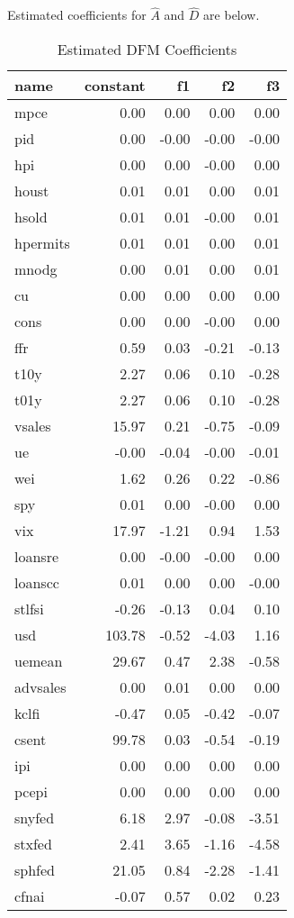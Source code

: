 \documentclass[11pt, letterpaper]{article}\usepackage[]{graphicx}\usepackage[]{color}
\begin{document}
Estimated coefficients for $\widehat{A}$ and $\widehat{D}$ are below.
\begin{table}[H]
\centering
\begingroup\footnotesize
\begin{tabular}{lrrrr}
  \hline
name & constant & f1 & f2 & f3 \\ 
  \hline
mpce & 0.00 & 0.00 & 0.00 & 0.00 \\ 
  pid & 0.00 & -0.00 & -0.00 & -0.00 \\ 
  hpi & 0.00 & 0.00 & -0.00 & 0.00 \\ 
  houst & 0.01 & 0.01 & 0.00 & 0.01 \\ 
  hsold & 0.01 & 0.01 & -0.00 & 0.01 \\ 
  hpermits & 0.01 & 0.01 & 0.00 & 0.01 \\ 
  mnodg & 0.00 & 0.01 & 0.00 & 0.01 \\ 
  cu & 0.00 & 0.00 & 0.00 & 0.00 \\ 
  cons & 0.00 & 0.00 & -0.00 & 0.00 \\ 
  ffr & 0.59 & 0.03 & -0.21 & -0.13 \\ 
  t10y & 2.27 & 0.06 & 0.10 & -0.28 \\ 
  t01y & 2.27 & 0.06 & 0.10 & -0.28 \\ 
  vsales & 15.97 & 0.21 & -0.75 & -0.09 \\ 
  ue & -0.00 & -0.04 & -0.00 & -0.01 \\ 
  wei & 1.62 & 0.26 & 0.22 & -0.86 \\ 
  spy & 0.01 & 0.00 & -0.00 & 0.00 \\ 
  vix & 17.97 & -1.21 & 0.94 & 1.53 \\ 
  loansre & 0.00 & -0.00 & -0.00 & 0.00 \\ 
  loanscc & 0.01 & 0.00 & 0.00 & -0.00 \\ 
  stlfsi & -0.26 & -0.13 & 0.04 & 0.10 \\ 
  usd & 103.78 & -0.52 & -4.03 & 1.16 \\ 
  uemean & 29.67 & 0.47 & 2.38 & -0.58 \\ 
  advsales & 0.00 & 0.01 & 0.00 & 0.00 \\ 
  kclfi & -0.47 & 0.05 & -0.42 & -0.07 \\ 
  csent & 99.78 & 0.03 & -0.54 & -0.19 \\ 
  ipi & 0.00 & 0.00 & 0.00 & 0.00 \\ 
  pcepi & 0.00 & 0.00 & 0.00 & 0.00 \\ 
  snyfed & 6.18 & 2.97 & -0.08 & -3.51 \\ 
  stxfed & 2.41 & 3.65 & -1.16 & -4.58 \\ 
  sphfed & 21.05 & 0.84 & -2.28 & -1.41 \\ 
  cfnai & -0.07 & 0.57 & 0.02 & 0.23 \\ 
   \hline
\end{tabular}
\endgroup
\caption{Estimated DFM Coefficients} 
\end{table}
\end{document}
